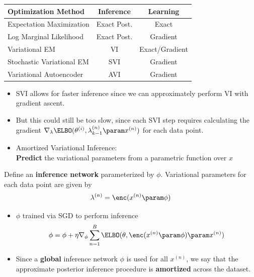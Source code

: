 \begin{frame}
\vspace{-3mm}
\begin{table}[]
    \centering
    \begin{tabular}{l c c }
    \toprule
        Optimization Method  & Inference & Learning \\
    \midrule
         Expectation Maximization & Exact Post. & Exact \\
         Log Marginal Likelihood & Exact Post. & Gradient \\
         Variational EM & VI & Exact/Gradient \\
         Stochastic Variational EM & SVI &  Gradient\\
         {\color{white} Variational Autoencoder} & {\color{white} AVI} & {\color{white} Gradient} \\
         \bottomrule
    \end{tabular}
\end{table}
\end{frame}

\begin{frame}
\begin{itemize}
    \item SVI allows for faster inference since we can approximately perform VI with 
    gradient ascent.
    \item But this could still be too slow, since each SVI step requires calculating the gradient $ \nabla_\lambda \ELBO(\theta^{(i)}, \lambda^{(n)}_{k-1} \param x^{(n)})$ for each data point.
    \item Amortized Variational Inference: \\
    \textbf{Predict} the variational parameters from a parametric function over $x$
\end{itemize}
\end{frame}

\begin{frame}
Define an \textbf{inference network} parameterized by $\phi$. Variational parameters for each data point
are given by
\[ \lambda^{(n)} = \enc(x^{(n)} \param \phi)\]
\begin{itemize}
    \item $\phi$ trained via SGD to perform inference
    \[ \phi = \phi + \eta \nabla_\phi \sum_{n=1}^B \ELBO(\theta, \enc(x^{(n)} \param \phi) \param x^{(n)})\]
    \item Since a \textbf{global} inference network $\phi$ is used for all $x^{(n)}$, we say that the approximate posterior inference procedure is \textbf{amortized} across the dataset.
\end{itemize}
\end{frame}

